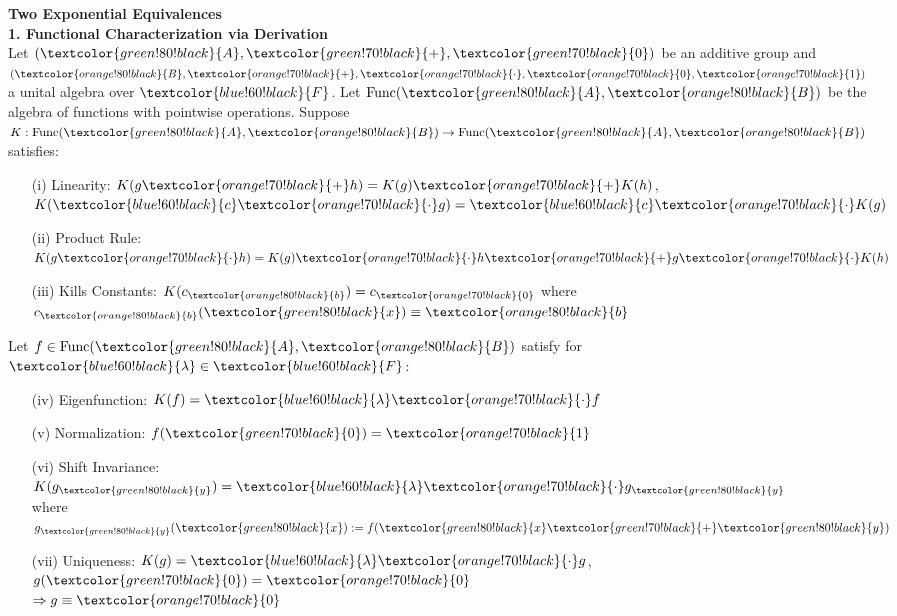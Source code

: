 \newcommand{\A}[1]{\textcolor{green!80!black}{#1}}          %
\newcommand{\B}[1]{\textcolor{orange!80!black}{#1}} %
\newcommand{\F}[1]{\textcolor{blue!60!black}{#1}}   %
\newcommand{\OpA}[1]{\textcolor{green!70!black}{#1}}        %
\newcommand{\OpB}[1]{\textcolor{orange!70!black}{#1}} %

\begin{technical}
{\Large\textbf{Two Exponential Equivalences}}\\[-0.5em]

\noindent\textbf{1. Functional Characterization via Derivation}\\[-0.5em]

Let \( (\A{A}, \OpA{+}, \OpA{0}) \) be an additive group and \( (\B{B}, \OpB{+}, \OpB{\cdot}, \OpB{0}, \OpB{1}) \) a unital algebra over \( \F{F} \). Let \( \mathrm{Func}(\A{A}, \B{B}) \) be the algebra of functions with pointwise operations. Suppose \( K: \mathrm{Func}(\A{A}, \B{B}) \to \mathrm{Func}(\A{A}, \B{B}) \) satisfies:

\vspace{-0.5em}
\begin{itemize}[leftmargin=3em,topsep=0pt,itemsep=0pt]
  \item[(i)] Linearity: \( K(g \OpB{+} h) = K(g) \OpB{+} K(h) \),\\
    \( K(\F{c} \OpB{\cdot} g) = \F{c} \OpB{\cdot} K(g) \)
  \item[(ii)] Product Rule: \( K(g \OpB{\cdot} h) = K(g) \OpB{\cdot} h \OpB{+} g \OpB{\cdot} K(h) \)
  \item[(iii)] Kills Constants: \( K(c_{\B{b}}) = c_{\OpB{0}} \) where \( c_{\B{b}}(\A{x}) \equiv \B{b} \)
\end{itemize}

Let \( f \in \mathrm{Func}(\A{A}, \B{B}) \) satisfy for \( \F{\lambda} \in \F{F} \):

\vspace{-0.5em}
\begin{itemize}[leftmargin=3em,topsep=0pt,itemsep=0pt]
  \item[(iv)] Eigenfunction: \( K(f) = \F{\lambda} \OpB{\cdot} f \)
  \item[(v)] Normalization: \( f(\OpA{0}) = \OpB{1} \)
  \item[(vi)] Shift Invariance: \( K(g_{\A{y}}) = \F{\lambda} \OpB{\cdot} g_{\A{y}} \)\\
    where \( g_{\A{y}}(\A{x}) := f(\A{x} \OpA{+} \A{y}) \)
  \item[(vii)] Uniqueness: \( K(g) = \F{\lambda} \OpB{\cdot} g \), \( g(\OpA{0}) = \OpB{0} \)\\
    \( \Rightarrow g \equiv \OpB{0} \)
\end{itemize}


\end{technical}
